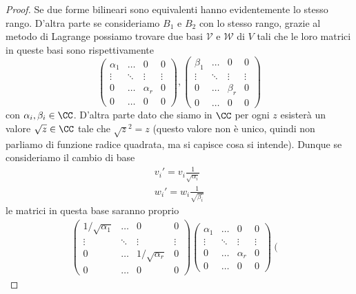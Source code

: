 \documentclass[11pt]{scrartcl}
\begin{document}
	\begin{proof}
		Se due forme bilineari sono equivalenti hanno evidentemente lo stesso rango. D'altra parte se consideriamo $B_1$ e $B_2$ con lo stesso rango, grazie al metodo di Lagrange possiamo trovare due basi $\mathcal{V}$ e $\mathcal{W}$ di $V$ tali che le loro matrici in queste basi sono rispettivamente
		$$
		\left(
		\begin{array}{ccc|c}
			\alpha_1 & \dots & 0 & 0 \\
			\vdots & \ddots & \vdots & \vdots \\
			0 & \dots & \alpha_r & 0 \\
			\hline
			0 & \dots & 0 & 0
		\end{array}
		\right),
		\left(
		\begin{array}{ccc|c}
			\beta_1 & \dots & 0 & 0 \\
			\vdots & \ddots & \vdots & \vdots \\
			0 & \dots & \beta_r & 0 \\
			\hline
			0 & \dots & 0 & 0
		\end{array}
		\right)
		$$
		con $\alpha_i,\beta_i\in \CC$. D'altra parte dato che siamo in $\CC$ per ogni $z$ esisterà un valore $\sqrt{z}\in\CC$ tale che $\sqrt{z}^2=z$ (questo valore non è unico, quindi non parliamo di funzione radice quadrata, ma si capisce cosa si intende). Dunque se consideriamo il cambio di base
		\begin{gather*}
			v_i'=v_i\frac{1}{\sqrt{\alpha_i}} \\
			w_i'=w_i\frac{1}{\sqrt{\beta_i}}
		\end{gather*}
		le matrici in questa base saranno proprio
		\begin{gather*}
			\left(
			\begin{array}{ccc|c}
				1/\sqrt{\alpha_1} & \dots & 0 & 0 \\
				\vdots & \ddots & \vdots & \vdots \\
				0 & \dots & 1/\sqrt{\alpha_r} & 0 \\
				\hline
				0 & \dots & 0 & 0
			\end{array}
			\right)
			\left(
			\begin{array}{ccc|c}
				\alpha_1 & \dots & 0 & 0 \\
				\vdots & \ddots & \vdots & \vdots \\
				0 & \dots & \alpha_r & 0 \\
				\hline
				0 & \dots & 0 & 0
			\end{array}
			\right)
			\left(
			\begin{array}{ccc|c}

\end{array}
\end{gather*}
\end{proof}
\end{document}

